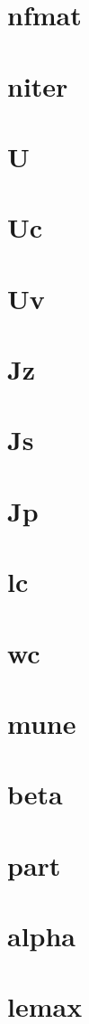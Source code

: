 \section{nfmat}
\section{niter}
\section{U}
\section{Uc}
\section{Uv}
\section{Jz}
\section{Js}
\section{Jp}
\section{lc}
\section{wc}
\section{mune}
\section{beta}
\section{part}
\section{alpha}
\section{lemax}
